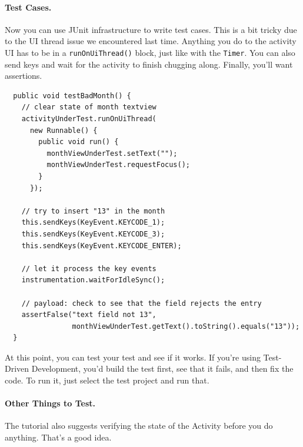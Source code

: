 \paragraph{Test Cases.} Now you can use JUnit infrastructure to write test cases.
This is a bit tricky due to the UI thread issue we encountered last time.
Anything you do to the activity UI has to be in a {\tt runOnUiThread()} block,
just like with the {\tt Timer}. You can also send keys and wait for the activity
to finish chugging along. Finally, you'll want assertions.

{\small
\begin{verbatim}
  public void testBadMonth() {
    // clear state of month textview
    activityUnderTest.runOnUiThread(
      new Runnable() {
        public void run() {
          monthViewUnderTest.setText("");
          monthViewUnderTest.requestFocus();
        }
      });

    // try to insert "13" in the month
    this.sendKeys(KeyEvent.KEYCODE_1);
    this.sendKeys(KeyEvent.KEYCODE_3);
    this.sendKeys(KeyEvent.KEYCODE_ENTER);

    // let it process the key events
    instrumentation.waitForIdleSync();

    // payload: check to see that the field rejects the entry
    assertFalse("text field not 13", 
                monthViewUnderTest.getText().toString().equals("13"));
  }
\end{verbatim}
}

At this point, you can test your test and see if it works. If you're using
Test-Driven Development, you'd build the test first, see that it fails,
and then fix the code. To run it, just select the test project and run that.

\paragraph{Other Things to Test.}
The tutorial also suggests verifying the state of the Activity before
you do anything. That's a good idea.





